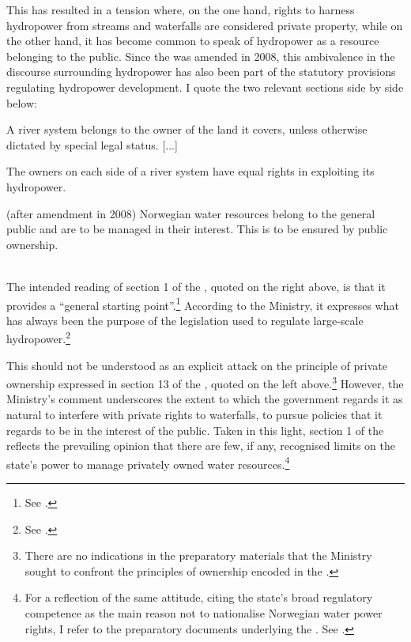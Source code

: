This has resulted in a tension where, on the one hand, rights to harness hydropower from streams and waterfalls are considered private property, while on the other hand, it has become common to speak of hydropower as a resource belonging to the public. Since the \cite{ica17} was amended in 2008, this ambivalence in the discourse surrounding hydropower has also been part of the statutory provisions regulating hydropower development. I quote the two relevant sections side by side below:%

{\begin{minipage}[t]{16em}
 \begin{aquote}{\tiny {}\dni\cite[13]{wra00}} \footnotesize A river system belongs to the owner of the land it covers, unless otherwise dictated by special legal status. [...]

The owners on each side of a river system have equal rights in exploiting its hydropower.
\end{aquote}  
\end{minipage}}
{\begin{minipage}[t]{22em}
\begin{aquote}{\tiny {}\dni\cite[1]{ica17} (after amendment in 2008)} \footnotesize Norwegian water resources belong to the general public and are to be managed in their interest. This is to be ensured by public ownership.
\end{aquote}
\end{minipage}} \\

The intended reading of section 1 of the \cite{ica17}, quoted on the right above, is that it provides a ``general starting point''.\footnote{See \cite[72]{otprp61}.} According to the Ministry, it expresses what has always been the purpose of the legislation used to regulate large-scale hydropower.\footnote{See \cite[72]{otprp61}.} 

This should not be understood as an explicit attack on the principle of private ownership expressed in section 13 of the \cite{wra00}, quoted on the left above.\footnote{There are no indications in the preparatory materials that the Ministry sought to confront the principles of ownership encoded in the \cite{wra00}.} However, the Ministry's comment underscores the extent to which the government regards it as natural to interfere with private rights to waterfalls, to pursue policies that it regards to be in the interest of the public. Taken in this light, section 1 of the \cite{ica17} reflects the prevailing opinion that there are few, if any, recognised limits on the state's power to manage privately owned water resources.\footnote{For a reflection of the same attitude, citing the state's broad regulatory competence as the main reason not to nationalise Norwegian water power rights, I refer to the preparatory documents underlying the \cite{wra00}. See \cite[152-153]{nou94}.}

